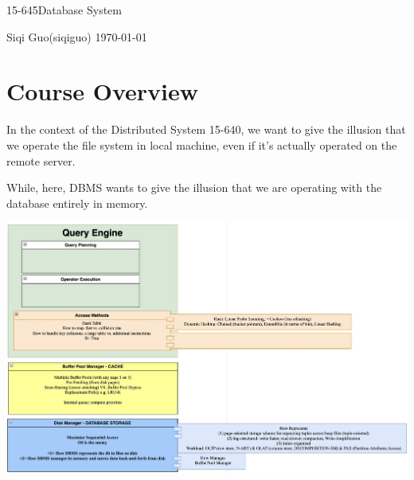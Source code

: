 \documentclass[letterpaper,11pt]{exam}
\newcommand{\coursenum}{15-645\quad}
\newcommand{\coursename}{\coursenum Database System}
\newcommand{\fullname}{Siqi Guo}
\newcommand{\andrew}{siqiguo}
\begin{document}
\begin{center}
    {\LARGE\coursename\par}
    \fullname \quad (\andrew) \hfill \today
\end{center}

\section*{Course Overview}


In the context of the Distributed System 15-640, we want to give the illusion that we operate the file system in local machine, even if it's actually operated on the remote server.

While, here, DBMS wants to give the illusion that we are operating with the database entirely in memory.

\vspace*{1em}
\includegraphics[width=\textwidth]{../diagram/diagram_1.jpg}


\end{document}
